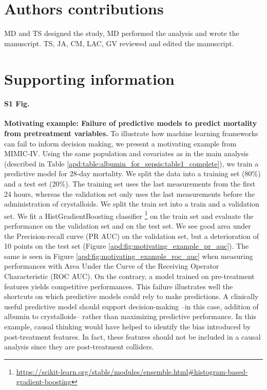 \documentclass[10pt,letterpaper]{article}
\begin{document}
\section*{Authors contributions}

MD and TS designed the study, MD performed the analysis and wrote the manuscript.
TS, JA, CM, LAC, GV reviewed and edited the manuscript.


\clearpage

\section*{Supporting information}

\paragraph*{S1 Fig.}
\label{apd:motivating_example}
{\bf Motivating example: Failure of predictive models to predict mortality
  from pretreatment variables.}
To illustrate how machine learning frameworks can fail to inform decision
making, we present a motivating example from MIMIC-IV. Using the same
population and covariates as in the main analysis (described in Table
\ref{apd:table:albumin_for_sepsis:table1_complete}), we train a predictive
model for 28-day mortality. We split the data into a training set (80\%) and a
test set (20\%). The training set uses the last measurements from the first 24
hours, whereas the validation set only uses the last measurements before the
administration of crystalloids. We split the train set into a train and a
validation set. We fit a HistGradientBoosting classifier
\footnote{\url{https://scikit-learn.org/stable/modules/ensemble.html\#histogram-based-gradient-boosting}}
on the train set and evaluate the performance on the validation set and on the
test set. We see good area under the Precision-recall curve (PR AUC) on the
validation set, but a deterioration of 10 points on the test set (Figure
\ref{apd:fig:motivating_example_pr_auc}). The same is seen in Figure
\ref{apd:fig:motivating_example_roc_auc} when measuring performances with Area
Under the Curve of the Receiving Operator Characteristic (ROC AUC). On the
contrary, a model trained on pre-treatment features yields competitive
performances. This failure illustrates well the shortcuts on which predictive
models could rely to make predictions. A clinically useful predictive model
should support decision-making --in this case, addition of albumin to
crystalloids-- rather than maximizing predictive performance. In this example,
causal thinking would have helped to identify the bias introduced by
post-treatment features. In fact, these features should not be included in a
causal analysis since they are post-treatment colliders.
\end{document}
